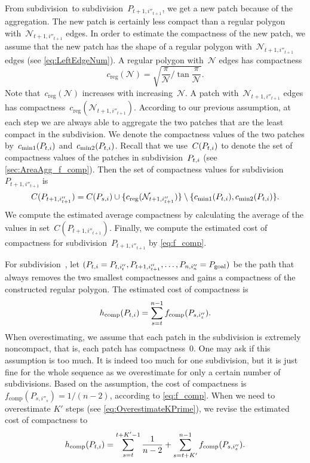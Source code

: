 From subdivision~\Pnode to subdivision~$P_{t+1,i''_{t+1}}$,
we get a new patch because of the aggregation.
The new patch is certainly less compact than a regular polygon 
with~$\mathcal{N}_{t+1,i''_{t+1}}$ edges.
In order to estimate the compactness of the new patch, 
we assume that 
the new patch has the shape of a regular polygon 
with~$\mathcal{N}_{t+1,i''_{t+1}}$ edges 
(see \eq\ref{eq:LeftEdgeNum}).
A regular polygon with~$\mathcal{N}$ edges has compactness
\begin{equation*}
\label{eq:comp_regular}
c_\mathrm{reg}(\mathcal{N})=
\sqrt{\frac{\pi}{\mathcal{N}} \bigg/
	\tan{\frac{\pi}{\mathcal{N}}}}.
\end{equation*}
Note that~$c_\mathrm{reg}(\mathcal{N})$ increases 
with increasing~$\mathcal{N}$.
A patch with~$\mathcal{N}_{t+1,i''_{t+1}}$ edges has
compactness~$c_\mathrm{reg} (\mathcal{N}_{t+1,i''_{t+1}})$.
According to our previous assumption, 
at each step we are always able to aggregate the two patches 
that are the least compact in the subdivision.
We denote the compactness values of the two patches
by~$c_\mathrm{min1}(P_{t,i})$ and~$c_\mathrm{min2}(P_{t,i})$.
Recall that we use~$C(P_{t,i})$ to denote 
the set of compactness values of the patches
in subdivision~$P_{t,i}$ 
(see \sect\ref{sec:AreaAgg_f_comp}).
Then the set of compactness values 
for subdivision~$P_{t+1,i''_{t+1}}$ is 
\begin{equation}
\label{eq:compsetnew}
C(P_{t+1,i''_{t+1}})=
C(P_{s,i})\cup 
\{c_\mathrm{reg} (\mathcal{N}_{t+1,i''_{t+1}})\}
\setminus \{c_\mathrm{min1}(P_{t,i}), c_\mathrm{min2}(P_{t,i})\}.
\nonumber
\end{equation}
We compute the estimated average compactness 
by calculating the average 
of the values in set~$C(P_{t+1,i''_{t+1}})$.
Finally, we compute the estimated cost of compactness 
for subdivision~$P_{t+1,i''_{t+1}}$ by \eq\ref{eq:f_comp}.

For subdivision~\Pnode, let
$(P_{t,i}=P_{t,i''_t}, P_{t+1,i''_{t+1}}, 
\dots,P_{n,i''_n}=P_\mathrm{goal})$
be the path that always removes the two smallest compactnesses
and gains a compactness of the constructed regular polygon.
The estimated cost of compactness is
\begin{equation}
\label{eq:h_comp}
h_\mathrm{comp}(P_{t,i})=
\sum_{s=t}^{n-1}f_\mathrm{comp}(P_{s,i''_s}).
\end{equation}
When overestimating, we assume that 
each patch in the subdivision is extremely noncompact,
that is, each patch has compactness~$0$.
One may ask if this assumption is too much.
It is indeed too much for one subdivision, 
but it is just fine for the whole sequence
as we overestimate for only a certain number of subdivisions.
Based on the assumption, the cost of compactness 
is~$f_\mathrm{comp}(P_{s,i''_s})=1/(n-2)$,
according to \eq\ref{eq:f_comp}.
When we need to overestimate $K'$ steps
(see \eq\ref{eq:OverestimateKPrime}), 
we revise the estimated cost of compactness to
\begin{equation}
\label{eq:o_comp}
h_\mathrm{comp}(P_{t,i})=
\sum_{s=t}^{t+K'-1}\frac{1}{n-2}+
\sum_{s=t+K'}^{n-1}f_\mathrm{comp}(P_{s,i''_s}).
\end{equation}



